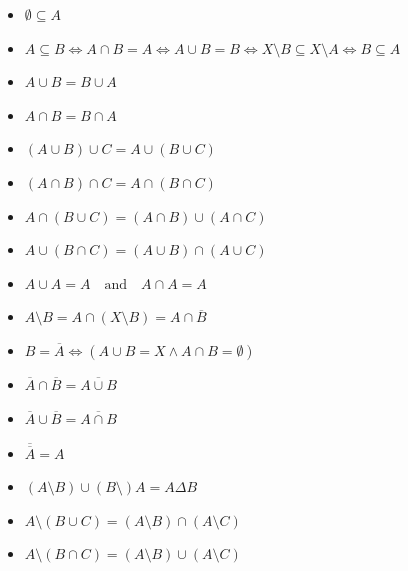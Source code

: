 \begin{itemize}
	
	\item \(\emptyset \subseteq A\)
	
	\item \(A \subseteq B \iff A \cap B = A \iff A \cup B = B \iff X \setminus B \subseteq X 
		  \setminus A \iff B \subseteq A\)
	
	\item \(A \cup B = B \cup A\) 
	
	\item \(A \cap B = B \cap A\) 
	
	\item \((A \cup B) \cup C = A \cup (B \cup C)\) 
	
	\item \((A \cap B) \cap C = A \cap (B \cap C)\) 
	
	\item \(A \cap (B \cup C) = (A \cap B) \cup (A \cap C)\) 
	
	\item \(A \cup (B \cap C) = (A \cup B) \cap (A \cup C)\) 
		
	\item \(A \cup A = A \quad \text{and} \quad A \cap A = A\)
	
	\item \(A \setminus B = A \cap (X \setminus B) = A \cap \overline{B}\)
	
	\item \(B = \overline{A} \iff (A \cup B = X \land A \cap B = \emptyset)\) 
	
	\item \(\overline{A} \cap \overline{B} = \overline{A \cup B}\) 
	
	\item \(\overline{A} \cup \overline{B} = \overline{A \cap B}\) 
	
	\item \(\overline{\overline{A}} = A\)

	\item \((A \setminus B) \cup (B \setminus) A = A \Delta B\)

	\item \(A \setminus (B \cup C) = (A \setminus B) \cap (A \setminus C) \)
	
	\item \(A \setminus (B \cap C) = (A \setminus B) \cup (A \setminus C) \)

\end{itemize}

